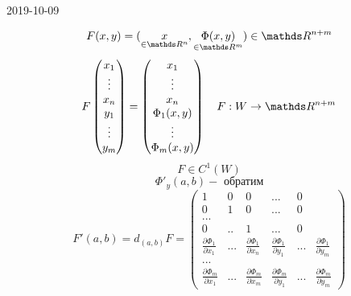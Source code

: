 \documentclass[main]{subfiles}
\begin{document}
\begin{lect} {2019-10-09}
		\begin{Proof}
					\[F(x, y) = (\us{\in \R^n}{x}, \us{\in \R^m}{\Phi(x,y)}) \in \R^{n + m}\]
					\[F \begin{pmatrix}
						x_1\\
						\vdots\\
						x_n\\
						y_1\\
						\vdots\\
						y_m
					\end{pmatrix} =
					\begin{pmatrix}
						x_1\\
						\vdots\\
						x_n\\
						\Phi_1(x,y)\\
						\vdots\\
						\Phi_m(x, y)
					\end{pmatrix}
					\q F : W \to \R^{n + m} \]
					\[F \in C^{1}(W) \]
					\[\Phi'_y(a, b) - \text{ обратим}\]
					\[F'(a, b) = d_{(a, b)} F =
					\begin{pmatrix}
						1 & 0 & 0  & ... & 0\\
						0 & 1 & 0  & ... & 0\\
						...\\
						0 & .. &  1 & ... & 0\\
						\frac{\partial \Phi_1}{\partial x_1} & ... & \frac{\partial \Phi_1}{\partial x_n} &
						\frac{\partial \Phi_1}{\partial y_1} & ... & \frac{\partial \Phi_1}{\partial y_m}\\
						...\\
						\frac{\partial \Phi_m}{\partial x_1} & ... & \frac{\partial \Phi_m}{\partial x_m} &
						\frac{\partial \Phi_m}{\partial y_1} & ... & \frac{\partial \Phi_m}{\partial y_m}


\end{pmatrix}\]
\end{Proof}
\end{lect}
\end{document}
